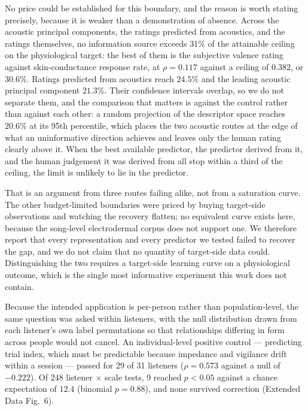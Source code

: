 No price could be established for this boundary, and the reason is worth stating
precisely, because it is weaker than a demonstration of absence. Across the
acoustic principal components, the ratings predicted from acoustics, and the
ratings themselves, no information source exceeds 31\% of the attainable ceiling on
the physiological target: the best of them is the subjective valence rating against
skin-conductance response rate, at $\rho = 0.117$ against a ceiling of $0.382$, or
$30.6\%$. Ratings predicted from acoustics reach $24.5\%$ and the leading acoustic
principal component $21.3\%$. Their confidence intervals overlap, so we do not
separate them, and the comparison that matters is against the control rather than
against each other: a random projection of the descriptor space reaches $20.6\%$ at
its 95th percentile, which places the two acoustic routes at the edge of what an
uninformative direction achieves and leaves only the human rating clearly above it.
When the best available predictor, the predictor derived from it, and the human
judgement it was derived from all stop within a third of the ceiling, the limit is
unlikely to lie in the predictor.

That is an argument from three routes failing alike, not from a saturation curve.
The other budget-limited boundaries were priced by buying target-side observations
and watching the recovery flatten; no equivalent curve exists here, because the
song-level electrodermal corpus does not support one. We therefore report that
every representation and every predictor we tested failed to recover the gap, and
we do not claim that no quantity of target-side data could. Distinguishing the two
requires a target-side learning curve on a physiological outcome, which is the
single most informative experiment this work does not contain.

Because the intended application is per-person rather than population-level, the
same question was asked within listeners, with the null distribution drawn from
each listener's own label permutations so that relationships differing in form
across people would not cancel. An individual-level positive control ---
predicting trial index, which must be predictable because impedance and vigilance
drift within a session --- passed for 29 of 31 listeners ($\rho = 0.573$ against a
null of $-0.222$). Of 248 listener $\times$ scale tests, 9 reached $p < 0.05$
against a chance expectation of $12.4$ (binomial $p = 0.88$), and none survived
correction (Extended Data Fig.~6).

